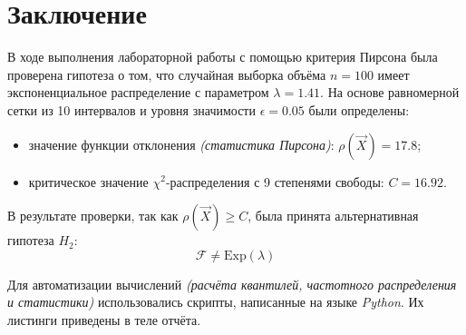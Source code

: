 \section{Заключение}

В ходе выполнения лабораторной работы с помощью критерия Пирсона была проверена гипотеза о том, что случайная выборка объёма $n=100$ имеет экспоненциальное распределение с параметром $\lambda=1.41$. На основе равномерной сетки из 10 интервалов и уровня значимости $\epsilon=0.05$ были определены:
\begin{itemize}
    \item значение функции отклонения \textit{(статистика Пирсона)}: $\rho(\vec{X}) = 17.8$;
    \item критическое значение $\chi^{2}$-распределения с 9 степенями свободы: $C = 16.92$.
\end{itemize}

В результате проверки, так как $\rho(\vec{X}) \ge C$, была принята альтернативная гипотеза $H_{2}$:
\[
    \mathcal{F} \ne \textrm{Exp}(\lambda)
\]

Для автоматизации вычислений \textit{(расчёта квантилей, частотного распределения и статистики)} использовались скрипты, написанные на языке \textit{Python}. Их листинги приведены в теле отчёта.